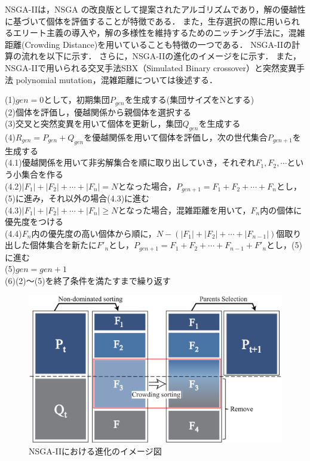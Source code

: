 \documentclass[../main/main]{subfiles}
\begin{document}
NSGA-IIは，NSGA \cite{Srinivas1994muiltiobjective}の改良版として提案されたアルゴリズムであり，解の優越性に基づいて個体を評価することが特徴である．
また，生存選択の際に用いられるエリート主義の導入や，解の多様性を維持するためのニッチング手法に，混雑距離(Crowding Distance)を用いていることも特徴の一つである．
NSGA-IIの計算の流れを以下に示す．
さらに，NSGA-IIの進化のイメージをに示す．
また，NSGA-IIで用いられる交叉手法SBX（Simulated Binary crossover）と突然変異手法 polynomial mutation，混雑距離については後述する．

\begin{screen}
\noindent(1)$gen=0$として，初期集団$P_{gen}$を生成する(集団サイズをNとする)\\
(2)個体を評価し，優越関係から親個体を選択する\\
(3)交叉と突然変異を用いて個体を更新し，集団$Q_{gen}$を生成する\\
(4)$R_{gen}=P_{gen}+Q_{gen}$を優越関係を用いて個体を評価し，次の世代集合$P_{gen+1}$を生成する\\
\quad(4.1)優越関係を用いて非劣解集合を順に取り出していき，それぞれ$F_1,F_2,\cdots$という小集合を作る\\
\quad(4.2)$|F_1|+|F_2|+\cdots +|F_n| = N$となった場合，$P_{gen+1}=F_1+F_2+\cdots +F_n$とし，(5)に進み，それ以外の場合(4.3)に進む\\
\quad(4.3)$|F_1|+|F_2|+\cdots +|F_n| \geq N$となった場合，混雑距離を用いて，$F_n$内の個体に優先度をつける\\
\quad(4.4)$F_n$内の優先度の高い個体から順に，$N-(|F_1|+|F_2|+\cdots +|F_{n-1}|)$個取り出した個体集合を新たに$F\prime_n$とし，$P_{gen+1}=F_1+F_2+\cdots +F_{n-1}+F\prime_n$とし，(5)に進む\\
(5)$gen=gen+1$\\
(6)(2)〜(5)を終了条件を満たすまで繰り返す
\end{screen}

\vspace{0.2in}
\begin{figure}[htbp]
\begin{center}
\includegraphics[width=1\linewidth]{../figures/nsga.eps}
\end{center}
\caption{NSGA-IIにおける進化のイメージ図}
\label{nsga_ii}
\end{figure}
\end{document}
